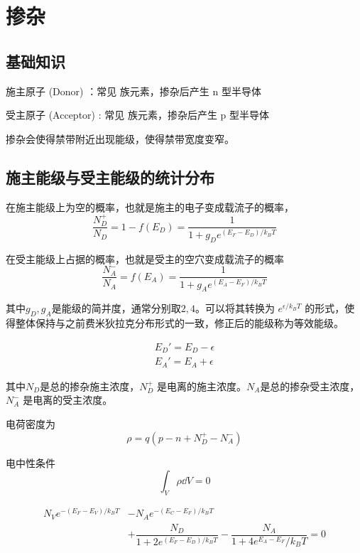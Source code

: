 \documentclass[cn,11pt,chinese,black,simple]{../elegantbook}
\begin{document}
\fi 


\chapter{掺杂}

\section{基础知识}

施主原子 (Donor) ：常见  族元素，掺杂后产生 n 型半导体

受主原子 (Acceptor) : 常见  族元素，掺杂后产生 p 型半导体

掺杂会使得禁带附近出现能级，使得禁带宽度变窄。


\section{施主能级与受主能级的统计分布}

在施主能级上为空的概率，也就是施主的电子变成载流子的概率， \[\dfrac{N_D^+}{N_D} = 1 - f(E_D) =\dfrac{1}{1 + g_D e^{(E_F - E_D)/k_B T}}\]


在受主能级上占据的概率，也就是受主的空穴变成载流子的概率 \[\dfrac{N_A^-}{N_A} = f(E_A) = \dfrac{1}{1 + g_A e^{(E_A - E_F)/k_B T}}\]


其中\(g_D, g_A\)是能级的简并度，通常分别取\(2,4\)。可以将其转换为 \(e^{\epsilon / k_B T}\) 的形式，使得整体保持与之前费米狄拉克分布形式的一致，修正后的能级称为等效能级。

\begin{equation*}
    \begin{aligned}
        E_D' = E_D - \epsilon \\
        E_A' = E_A + \epsilon
    \end{aligned}
\end{equation*}


其中\(N_D\)是总的掺杂施主浓度，\(N_D^+\) 是电离的施主浓度。\(N_A\)是总的掺杂受主浓度，\(N_A^-\) 是电离的受主浓度。


电荷密度为 
\[\rho = q (p - n + N_D^+ - N_A^-)\]

电中性条件 \[\int_{V} \rho \dd{V} = 0 \]

\begin{equation}\label{eq:ch2:1}
    \begin{aligned}
        N_Ve^{-(E_F-E_V)/k_B T} &- N_A e^{-(E_C - E_F)/k_B T} \\
        & + \dfrac{N_D}{1 + 2 e^{(E_F - E_D)/k_B T}} - \dfrac{N_A}{1 + 4 e^{E_A - E_F}/k_B T } = 0
    \end{aligned}
\end{equation}
\end{document}
